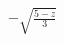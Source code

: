 \documentclass[preview]{standalone}
\begin{document}
\begin{center}
$-\sqrt{\frac{5-z}{3}}$
\end{center}
\end{document}
